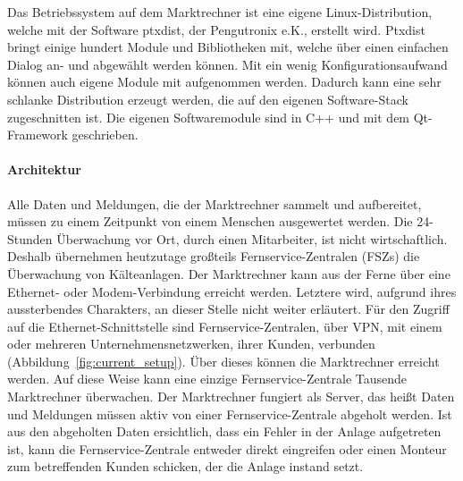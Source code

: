 \documentclass[11pt,a4paper]{report}
\begin{document}
Das Betriebssystem auf dem Marktrechner ist eine eigene Linux-Distribution, welche mit der Software ptxdist, der  Pengutronix e.K., erstellt wird. Ptxdist bringt einige hundert Module und Bibliotheken mit, welche über einen einfachen Dialog an- und abgewählt werden können. Mit ein wenig Konfigurationsaufwand können auch eigene Module mit aufgenommen werden. Dadurch kann eine sehr schlanke Distribution erzeugt werden, die  auf den eigenen Software-Stack zugeschnitten ist. Die eigenen Softwaremodule sind in C++ und mit dem Qt-Framework geschrieben. 

\paragraph{Architektur} \label{para:architektur}

Alle Daten und Meldungen, die der Marktrechner sammelt und aufbereitet, müssen zu einem Zeitpunkt von einem Menschen ausgewertet werden. Die 24-Stunden Überwachung vor Ort, durch einen Mitarbeiter, ist nicht wirtschaftlich. Deshalb übernehmen heutzutage großteils Fernservice-Zentralen (FSZs) die Überwachung von Kälteanlagen. Der Marktrechner kann aus der Ferne über eine Ethernet- oder Modem-Verbindung erreicht werden. Letztere wird, aufgrund ihres aussterbendes Charakters, an dieser Stelle nicht weiter erläutert. Für den Zugriff auf die Ethernet-Schnittstelle sind Fernservice-Zentralen, über VPN, mit einem oder mehreren Unternehmensnetzwerken, ihrer Kunden, verbunden (Abbildung~\ref{fig:current_setup}). Über dieses können die Marktrechner erreicht werden. Auf diese Weise kann eine einzige Fernservice-Zentrale Tausende Marktrechner überwachen. Der Marktrechner fungiert als Server, das heißt Daten und Meldungen müssen aktiv von einer Fernservice-Zentrale abgeholt werden. Ist aus den abgeholten Daten ersichtlich, dass ein Fehler in der Anlage aufgetreten ist, kann die Fernservice-Zentrale entweder direkt eingreifen oder einen Monteur zum betreffenden Kunden schicken, der die Anlage instand setzt.

\end{document}
